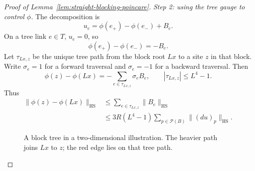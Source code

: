 \documentclass[10pt,reqno]{amsart}
\theoremstyle{definition}
\theoremstyle{remark}
\numberwithin{equation}{section}
\numberwithin{figure}{section}
\begin{document}
\begin{proof}[Proof of Lemma~\ref{lem:straight-blocking-poincare}]
\emph{Step 2: using the tree gauge to control $\phi$.}
The decomposition is
\begin{equation}\label{eq:poincare-gradient-decomposition}
u_e=\phi(e_+)-\phi(e_-)+B_e.
\end{equation}
On a tree link $e\in T$, $u_e=0$, so
\begin{equation}\label{eq:poincare-tree-gradient}
\phi(e_+)-\phi(e_-)=-B_e.
\end{equation}
Let $\tau_{Lx,z}$ be the unique tree path from the block root $Lx$ to a site
$z$ in that block. Write $\sigma_e=1$ for a forward traversal and
$\sigma_e=-1$ for a backward traversal. Then
\begin{equation}\label{eq:poincare-tree-potential}
\phi(z)-\phi(Lx)=-\sum_{e\in\tau_{Lx,z}}\sigma_eB_e,
\qquad |\tau_{Lx,z}|\le L^4-1.
\end{equation}
Thus
\begin{equation}\label{eq:poincare-tree-bound}
\begin{aligned}
\|\phi(z)-\phi(Lx)\|_{\mathrm{HS}}
&\le\sum_{e\in\tau_{Lx,z}}\|B_e\|_{\mathrm{HS}}\\
&\le3R(L^4-1)\sum_{p\in\mathcal P(B)}\|(du)_p\|_{\mathrm{HS}}.
\end{aligned}
\end{equation}
\begin{figure}[htbp]
\centering
{}
\caption{A block tree in a two-dimensional illustration. The heavier path
joins $Lx$ to $z$; the red edge lies on that tree path.}
\label{fig:poincare-tree-path}
\end{figure}


\end{proof}
\end{document}
